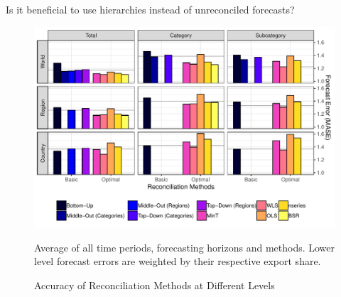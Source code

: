 \documentclass[a4paper,fleqn,11pt]{article}
\begin{document}
 Is it beneficial to use hierarchies instead of unreconciled forecasts?
 \begin{figure}[H]
 	\includegraphics[width=\textwidth]{fig/fig_eval_mase}
 	\caption{Accuracy of Reconciliation Methods at Different Levels}
 	\footnotesize{Average of all time periods, forecasting horizons and methods. Lower level forecast errors are weighted by their respective export share.}
 \end{figure}
\end{document}
